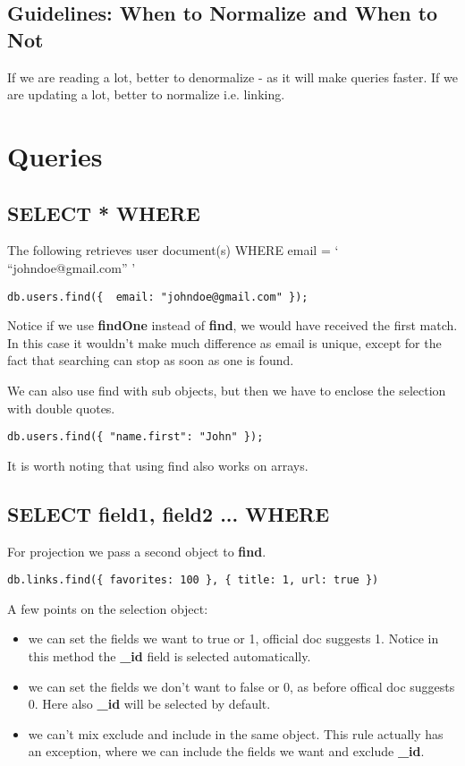 \documentclass[a4paper, 12pt]{article}
\begin{document}
\subsection{Guidelines: When to Normalize and When to Not}
If we are reading a lot, better to denormalize - as it will make queries faster. If we are updating a lot, better to normalize i.e. linking.

\section{Queries}
\subsection{SELECT * WHERE}
The following retrieves user document(s) WHERE email = ` ``johndoe@gmail.com'' '
\begin{verbatim}
db.users.find({  email: "johndoe@gmail.com" });
\end{verbatim}
Notice if we use \textbf{findOne} instead of \textbf{find}, we would have received the first match. In this case it wouldn't make much difference as email is unique, except for the fact that searching can stop as soon as one is found.

We can also use find with sub objects, but then we have to enclose the selection with double quotes.
\begin{verbatim}
db.users.find({ "name.first": "John" });
\end{verbatim}

It is worth noting that using find also works on arrays.
\subsection{SELECT field1, field2 ... WHERE}
For projection we pass a second object to \textbf{find}.
\begin{verbatim}
db.links.find({ favorites: 100 }, { title: 1, url: true })
\end{verbatim}
A few points on the selection object:
\begin{itemize}
	\item we can set the fields we want to true or 1, official doc suggests 1. Notice in this method the \textbf{\_id} field is selected automatically.	
	\item we can set the fields we don't want to false or 0, as before offical doc suggests 0. Here also \textbf{\_id} will be selected by default.
	\item we can't mix exclude and include in the same object. This rule actually has an exception, where we can include the fields we want and exclude \textbf{\_id}.
\end{itemize}
\end{document}
